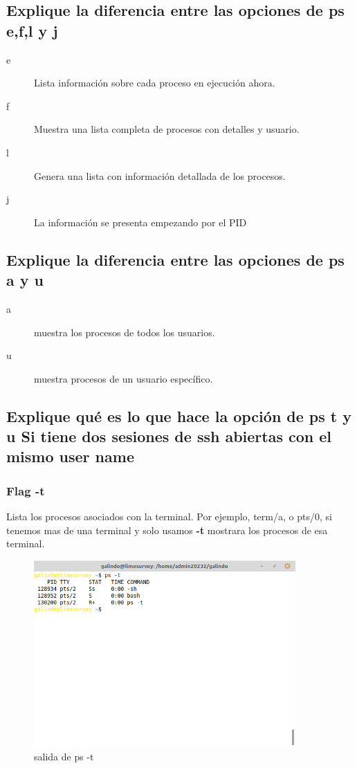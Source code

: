 \documentclass[11pt]{article}
\begin{document}
\subsection{Explique la diferencia entre las opciones de ps e,f,l y j}
\label{sec:org7ef7970}

\begin{description}
\item[{e}] Lista información sobre cada proceso en ejecución ahora.
\item[{f}] Muestra una lista completa de procesos con detalles y usuario.
\item[{l}] Genera una lista con información detallada de los procesos.
\item[{j}] La información se presenta empezando por el PID
\end{description}

\subsection{Explique la diferencia entre las opciones de ps a y u}
\label{sec:orgfc817b9}
\begin{description}
\item[{a}] muestra los procesos de todos los usuarios.
\item[{u}] muestra procesos de un usuario específico.
\end{description}

\pagebreak

\subsection{Explique qué es lo que hace la opción de ps t y u Si tiene dos sesiones de ssh abiertas con el mismo user name}
\label{sec:org0059808}
\subsubsection*{Flag -t}
\label{sec:org96db1aa}
Lista los procesos asociados con la terminal. Por ejemplo, term/a, o pts/0, si
tenemos mas de una terminal y solo usamos \textbf{-t} mostrara los procesos de esa 
terminal.  

\begin{figure}[htbp]
\centering
\includegraphics[width=10cm]{img/mt.png}
\caption{salida de ps -t}
\end{figure}
\end{document}
